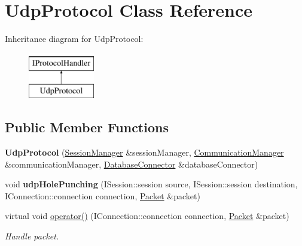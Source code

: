 \hypertarget{class_udp_protocol}{\section{Udp\-Protocol Class Reference}
\label{class_udp_protocol}
}
Inheritance diagram for Udp\-Protocol\-:\begin{figure}[H]
\begin{center}
\leavevmode
\includegraphics[height=2.000000cm]{class_udp_protocol}
\end{center}
\end{figure}
\subsection*{Public Member Functions}
\begin{DoxyCompactItemize}
\item 
\hypertarget{class_udp_protocol_a7c1ddcddc1d351a6760942c26bf329d9}{{\bfseries Udp\-Protocol} (\hyperlink{class_session_manager}{Session\-Manager} \&session\-Manager, \hyperlink{class_communication_manager}{Communication\-Manager} \&communication\-Manager, \hyperlink{class_database_connector}{Database\-Connector} \&database\-Connector)}\label{class_udp_protocol_a7c1ddcddc1d351a6760942c26bf329d9}

\item 
\hypertarget{class_udp_protocol_a937119a3e2dd990c1d1618f3a87071fc}{void {\bfseries udp\-Hole\-Punching} (I\-Session\-::session source, I\-Session\-::session destination, I\-Connection\-::connection connection, \hyperlink{class_packet}{Packet} \&packet)}\label{class_udp_protocol_a937119a3e2dd990c1d1618f3a87071fc}

\item 
virtual void \hyperlink{class_udp_protocol_aae3a5ab60c55602d33c4721af00b58a0}{operator()} (I\-Connection\-::connection connection, \hyperlink{class_packet}{Packet} \&packet)
\begin{DoxyCompactList}\small\item\em Handle packet. \end{DoxyCompactList}\end{DoxyCompactItemize}


